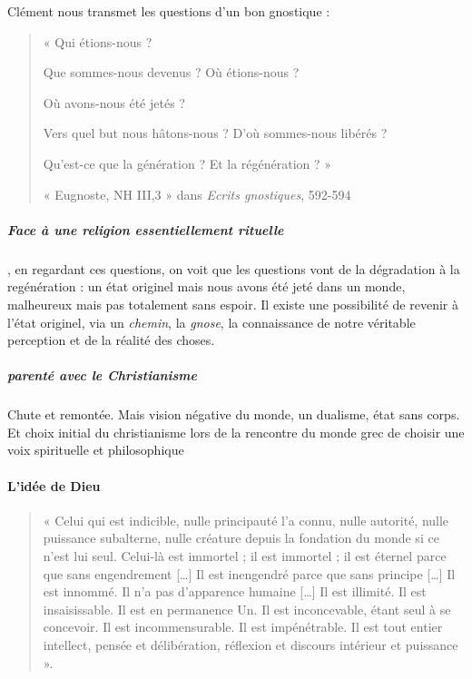     Clément nous transmet les questions d'un bon gnostique : 
    
    \begin{quote}
        


« Qui étions-nous ?

Que sommes-nous devenus ? Où étions-nous ?

Où avons-nous été jetés ?

Vers quel but nous hâtons-nous ? D'où sommes-nous libérés ?

Qu'est-ce que la génération ? Et la régénération ? »

« Eugnoste, NH III,3 » dans \emph{Ecrits gnostiques}, 592-594
    \end{quote}
      
      \subparagraph{Face à  une religion essentiellement rituelle}, en regardant ces questions, on voit que les questions vont de la dégradation à la regénération : un état originel mais nous avons été jeté dans un monde, malheureux mais pas totalement sans espoir. Il existe une possibilité de revenir à l'état originel, via un \textit{chemin}, la \emph{gnose}, la connaissance de notre véritable perception et de la réalité des choses.
      
      \subparagraph{parenté avec le Christianisme} Chute et remontée. Mais vision négative du monde, un dualisme, état sans corps. Et choix initial du christianisme lors de la rencontre du monde grec de choisir une voix spirituelle et philosophique
      
      \paragraph{L'idée de Dieu} 
      
      \begin{quote}
          « Celui qui est indicible, nulle principauté l'a connu, nulle autorité,
nulle puissance subalterne, nulle créature depuis la fondation du monde
si ce n'est lui seul. Celui-là est immortel ; il est immortel ; il est
éternel parce que sans engendrement {[}\ldots{]} Il est inengendré parce
que sans principe {[}\ldots{]} Il est innommé. Il n'a pas d'apparence
humaine {[}\ldots{]} Il est illimité. Il est insaisissable. Il est en
permanence Un. Il est inconcevable, étant seul à se concevoir. Il est
incommensurable. Il est impénétrable. Il est tout entier intellect,
pensée et délibération, réflexion et discours intérieur et puissance ». 
      \end{quote}
    
